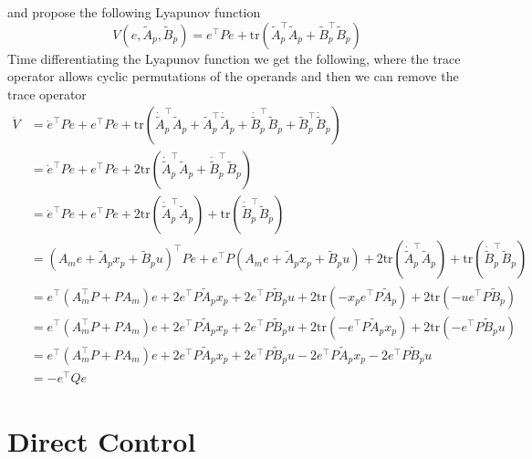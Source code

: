 and propose the following Lyapunov function
\begin{equation*}
  V(e,\tilde{A}_{p},\tilde{B}_{p})=e^{\top}Pe+\text{tr}\left(\tilde{A}_{p}^{\top}\tilde{A}_{p}+\tilde{B}_{p}^{\top}\tilde{B}_{p}\right)
\end{equation*}
Time differentiating the Lyapunov function we get the following, where the trace operator allows cyclic permutations of the operands and then we can remove the trace operator
\begin{align*}
  \dot{V}
  &
  =\dot{e}^{\top}Pe
  +e^{\top}P\dot{e}
  +\text{tr}\left(\dot{\tilde{A}}_{p}^{\top}\tilde{A}_{p}+\tilde{A}_{p}^{\top}\dot{\tilde{A}}_{p}+\dot{\tilde{B}}_{p}^{\top}\tilde{B}_{p}+\tilde{B}_{p}^{\top}\dot{\tilde{B}}_{p}\right) \\
  &
  =\dot{e}^{\top}Pe
  +e^{\top}P\dot{e}
  +2\text{tr}\left(\dot{\tilde{A}}_{p}^{\top}\tilde{A}_{p}+\dot{\tilde{B}}_{p}^{\top}\tilde{B}_{p}\right) \\
  &
  =\dot{e}^{\top}Pe
  +e^{\top}P\dot{e}
  +2\text{tr}\left(\dot{\tilde{A}}_{p}^{\top}\tilde{A}_{p}\right)+\text{tr}\left(\dot{\tilde{B}}_{p}^{\top}\tilde{B}_{p}\right) \\
  &
  =(A_{m}e+\tilde{A}_{p}x_{p}+\tilde{B}_{p}u)^{\top}Pe
  +e^{\top}P(A_{m}e+\tilde{A}_{p}x_{p}+\tilde{B}_{p}u)
  +2\text{tr}\left(\dot{\tilde{A}}_{p}^{\top}\tilde{A}_{p}\right)
  +\text{tr}\left(\dot{\tilde{B}}_{p}^{\top}\tilde{B}_{p}\right) \\
  &
  =e^{\top}(A_{m}^{\top}P+PA_{m})e
  +2e^{\top}P\tilde{A}_{p}x_{p}
  +2e^{\top}P\tilde{B}_{p}u
  +2\text{tr}\left(-x_{p}e^{\top}P\tilde{A}_{p}\right)
  +2\text{tr}\left(-ue^{\top}P\tilde{B}_{p}\right) \\
  &
  =e^{\top}(A_{m}^{\top}P+PA_{m})e
  +2e^{\top}P\tilde{A}_{p}x_{p}
  +2e^{\top}P\tilde{B}_{p}u
  +2\text{tr}\left(-e^{\top}P\tilde{A}_{p}x_{p}\right)
  +2\text{tr}\left(-e^{\top}P\tilde{B}_{p}u\right) \\
  &
  =e^{\top}(A_{m}^{\top}P+PA_{m})e
  +2e^{\top}P\tilde{A}_{p}x_{p}
  +2e^{\top}P\tilde{B}_{p}u
  -2e^{\top}P\tilde{A}_{p}x_{p}
  -2e^{\top}P\tilde{B}_{p}u \\
  &
  =-e^{\top}Qe
\end{align*}

\section{Direct Control}

